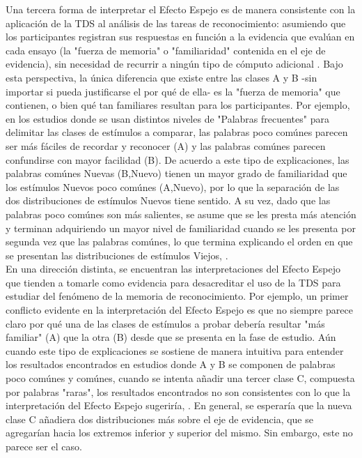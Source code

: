 Una tercera forma de interpretar el Efecto Espejo es de manera consistente con la aplicación de la TDS al análisis de las tareas de reconocimiento: asumiendo que los participantes registran sus respuestas en función a la evidencia que evalúan en cada ensayo (la "fuerza de memoria" o "familiaridad" contenida en el eje de evidencia), sin necesidad de recurrir a ningún tipo de cómputo adicional \parencite{Hintzman1994}. Bajo esta perspectiva, la única diferencia que existe entre las clases A y B -sin importar si pueda justificarse el por qué de ella- es la "fuerza de memoria" que contienen, o bien qué tan familiares resultan para los participantes. Por ejemplo, en los estudios donde se usan distintos niveles de "Palabras frecuentes" para delimitar las clases de estímulos a comparar, las palabras poco comúnes parecen ser más fáciles de recordar y reconocer (A) y las palabras comúnes parecen confundirse con mayor facilidad (B). De acuerdo a este tipo de explicaciones, las palabras comúnes Nuevas (B,Nuevo) tienen un mayor grado de familiaridad que los estímulos Nuevos poco comúnes (A,Nuevo), por lo que la separación de las dos distribuciones de estímulos Nuevos tiene sentido. A su vez, dado que las palabras poco comúnes son más salientes, se asume que se les presta más atención y terminan adquiriendo un mayor nivel de familiaridad cuando se les presenta por segunda vez que las palabras comúnes, lo que termina explicando el orden en que se presentan las distribuciones de estímulos Viejos, \parencite{Glanzer1993}.\\

En una dirección distinta, se encuentran las interpretaciones del Efecto Espejo que tienden a tomarle como evidencia para desacreditar el uso de la TDS para estudiar del fenómeno de la memoria de reconocimiento. Por ejemplo, un primer conflicto evidente en la interpretación del Efecto Espejo es que no siempre parece claro por qué una de las clases de estímulos a probar debería resultar "más familiar" (A) que la otra (B) desde que se presenta en la fase de estudio. Aún cuando este tipo de explicaciones se sostiene de manera intuitiva para entender los resultados encontrados en estudios donde A y B se componen de palabras poco comúnes y comúnes, cuando se intenta añadir una tercer clase C, compuesta por palabras "raras", los resultados encontrados no son consistentes con lo que la interpretación del Efecto Espejo sugeriría,  \parencite{Rao1984, Wixted1992}. En general, se esperaría que la nueva clase C añadiera dos distribuciones más sobre el eje de evidencia, que se agregarían hacia los extremos inferior y superior del mismo. Sin embargo, este no parece ser el caso.\\

